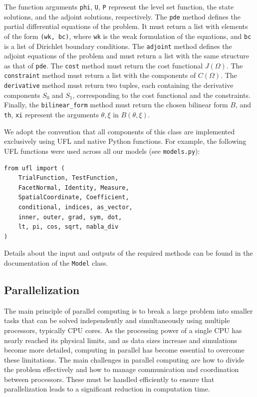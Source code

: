 \documentclass[iicol,pdflatex,sn-mathphys-ay]{sn-jnl}%
\theoremstyle{thmstyleone}%
\theoremstyle{thmstyletwo}%
\theoremstyle{thmstylethree}%
\begin{document}
The function arguments \texttt{phi}, \texttt{U}, \texttt{P} represent
the level set function, the state solutions, and the adjoint solutions,
respectively.
The \texttt{pde} method defines
the partial differential equations of the problem.
It must return a list with elements of the form \texttt{(wk, bc)},
where \texttt{wk} is the weak formulation of the equations,
and \texttt{bc} is a list of Dirichlet boundary conditions.
The \texttt{adjoint} method defines the adjoint equations of the problem and
must return a list with the same structure as that of \texttt{pde}. 
The \texttt{cost} method must return the cost functional $J(\Omega)$.
The \texttt{constraint} method must return
a list with the components of $C(\Omega)$.
The \texttt{derivative} method must return two tuples,
each containing the derivative components $S_0$ and $S_1$,
corresponding to the cost functional and the constraints.
Finally, the \texttt{bilinear\_form} method must return
the chosen bilinear form $B$, and \texttt{th},  \texttt{xi}
represent the arguments $\theta, \xi$ in $B(\theta, \xi)$.

We adopt the convention that all components of this class
are implemented exclusively using UFL and native Python functions.
For example, the following UFL functions were used
across all our models (see \texttt{models.py}):
\begin{lstlisting}
from ufl import (
    TrialFunction, TestFunction,
    FacetNormal, Identity, Measure,
    SpatialCoordinate, Coefficient,
    conditional, indices, as_vector,
    inner, outer, grad, sym, dot,
    lt, pi, cos, sqrt, nabla_div
)
\end{lstlisting}

Details about the input and outputs of the required methods
can be found in the documentation of the \texttt{Model} class.

\subsection{Parallelization}\label{sub:parallel}

The main principle of parallel computing is to break a large problem
into smaller tasks that can be solved independently and simultaneously
using multiple processors, typically CPU cores.
As the processing power of a single CPU has nearly reached its physical limits,
and as data sizes increase and simulations become more detailed,
computing in parallel has become essential to overcome these limitations.
The main challenges in parallel computing are how to divide
the problem effectively and how to manage communication
and coordination between processors.
These must be handled efficiently to ensure that parallelization
leads to a significant reduction in computation time.
\end{document}
